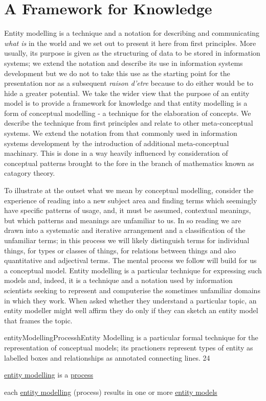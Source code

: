 
\section{A Framework for Knowledge}
\noindent Entity modelling is a technique and a notation for describing and communicating \textit{what is} in the world and we set out to present it here from first principles.  More usually, its purpose is given as the structuring of
data to be stored in information systems; we extend the notation and describe its use in information systems development but we do not to take this use
as the starting point for the presentation nor as a subsequent \textit{raison d'etre} because to do either would be to hide a greater potential. We take the wider view that the purpose 
of an entity model is to provide a framework for knowledge and that entity modelling is a form of conceptual modelling - a technique for the elaboration of concepts. We describe the technique from first principles and relate to other meta-conceptual systems. We extend the notation from that commonly used in information systems development by the introduction of additional meta-conceptual machinary. This is done in a way heavily influenced by consideration of conceptual patterns brought to the fore in the branch of mathematics known as catagory theory. 
 
To illustrate at the outset what we mean by conceptual modelling, consider the experience of reading into a new 
subject area and finding terms which seemingly have specific patterns of usage, and, 
it must be assumed, 
contextual meanings, but which patterns and meanings are unfamiliar to us. 
In so reading we are drawn into a 
systematic and iterative arrangement and a classification of the unfamiliar terms; 
in this process we will 
likely distinguish terms for individual things, for types or classes of things, for 
relations between things 
and also quantitative and adjectival terms. The mental process we follow will build for us a conceptual model. 
Entity modelling is a particular technique for expressing such models and, indeed, it is a technique and a notation used by information scientists seeking to represent and computerise the sometimes unfamiliar domains in which they work. When asked whether they understand 
a particular topic, an entity modeller might well affirm they do only if they can sketch an entity model that frames the topic.\\

\begin{erbulletedDimFig}{entityModellingProcess}{h}{Entity Modelling is a particular formal technique for the representation of conceptual models; 
its practioners represent types of entity as labelled boxes and relationships as annotated  connecting lines.} {2}{4}
\item{\underline{entity modelling} is a \underline{process}}
\item{each \underline{entity modelling} (process) results in one or more \underline{entity models}}
\end{erbulletedDimFig}

